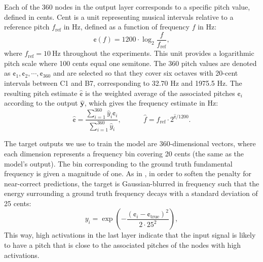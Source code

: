 Each of the 360 nodes in the output layer corresponds to a specific pitch value, defined in cents.
Cent is a unit representing musical intervals relative to a reference pitch $f_{\mathrm{ref}}$ in Hz, defined as a function of frequency $f$ in Hz:
\begin{equation}
\cent(f) = 1200 \cdot \log_2 \frac{f}{f_{\mathrm{ref}}},
\end{equation}
where $f_{\mathrm{ref}} = 10 \mathrm{~Hz}$ throughout the experiments. 
This unit provides a logarithmic pitch scale where 100 cents equal one semitone.
The 360 pitch values are denoted as $\cent_1, \cent_2, \cdots, \cent_{360}$ and are selected so that they cover six octaves with 20-cent intervals between C1 and B7, corresponding to 32.70 Hz and 1975.5 Hz. 
The resulting pitch estimate $\hat{\cent}$ is the weighted average of the associated pitches $\cent_i$ according to the output $\hat{\mathbf{y}}$, which gives the frequency estimate in Hz:
\begin{equation}\label{eqn:resulting}
\hat{\cent} = \frac{\sum_{i=1}^{360}\hat{y}_i \cent_i}{\sum_{i=1}^{360} \hat{y}_i}, ~~~~~~~~~~~~~~
\hat{f} = f_{\mathrm{ref}} \cdot 2 ^ {\hat{\cent} / 1200}.
\end{equation}

The target outputs we use to train the model are 360-dimensional vectors, where each dimension represents a frequency bin covering 20 cents (the same as the model's output).
The bin corresponding to the ground truth fundamental frequency is given a magnitude of one.
As in \cite{bittner2017deepsalience}, in order to soften the penalty for near-correct predictions, the target is Gaussian-blurred in frequency such that the energy surrounding a ground truth frequency decays with a standard deviation of 25 cents:
\begin{equation}\label{eqn:gaussian}
y_i = \exp \left ( {-\frac{(\cent_i - \cent_{\mathrm{true}})^2}{2 \cdot 25^2}} \right ),
\end{equation}
This way, high activations in the last layer indicate that the input signal is likely to have a pitch that is close to the associated pitches of the nodes with high activations.

